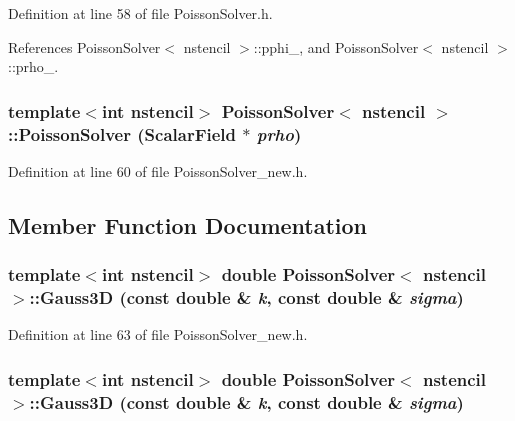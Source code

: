 Definition at line 58 of file PoissonSolver.h.



References PoissonSolver$<$ nstencil $>$::pphi\_\-, and PoissonSolver$<$ nstencil $>$::prho\_\-.

\subsubsection[{PoissonSolver}]{\setlength{\rightskip}{0pt plus 5cm}template$<$int nstencil$>$ {\bf PoissonSolver}$<$ nstencil $>$::{\bf PoissonSolver} ({\bf ScalarField} $\ast$ {\em prho})}\label{classPoissonSolver_a238d58c904311240b50b03d872d42cf8}


Definition at line 60 of file PoissonSolver\_\-new.h.



\subsection{Member Function Documentation}
\subsubsection[{Gauss3D}]{\setlength{\rightskip}{0pt plus 5cm}template$<$int nstencil$>$ double {\bf PoissonSolver}$<$ nstencil $>$::Gauss3D (const double \& {\em k}, \/  const double \& {\em sigma})}\label{classPoissonSolver_ae2e90b5bf9b5fc2069a3cafc17471714}


Definition at line 63 of file PoissonSolver\_\-new.h.

\subsubsection[{Gauss3D}]{\setlength{\rightskip}{0pt plus 5cm}template$<$int nstencil$>$ double {\bf PoissonSolver}$<$ nstencil $>$::Gauss3D (const double \& {\em k}, \/  const double \& {\em sigma})}\label{classPoissonSolver_ae2e90b5bf9b5fc2069a3cafc17471714}


